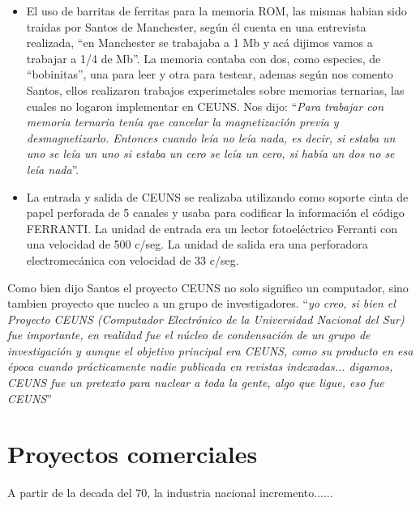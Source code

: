 \documentclass[%
 	final,
%
	notitlepage,
	narroweqnarray,
	inline,
 	twoside,
	]{ieee}
\begin{document}
\begin{itemize}
\item El uso de barritas de ferritas para la memoria ROM, las mismas habian sido traidas por Santos de Manchester, seg\'un \'el cuenta en una entrevista realizada, ``en Manchester se trabajaba a 1 Mb y ac\'a dijimos vamos a trabajar a 1/4 de Mb''. La memoria contaba con dos, como especies, de ``bobinitas'', una para leer y otra para testear, ademas seg\'un nos comento Santos, ellos realizaron trabajos experimetales sobre memorias ternarias, las cuales no logaron implementar en CEUNS. Nos dijo: ``\textit{Para trabajar con memoria ternaria ten\'ia que cancelar la magnetizaci\'on previa y desmagnetizarlo. Entonces cuando le\'ia no le\'ia nada, es decir, si estaba un uno se le\'ia un uno si estaba un cero se le\'ia un cero, si hab\'ia un dos no se le\'ia nada}''.
\item La entrada y salida de CEUNS se realizaba utilizando como soporte cinta de papel perforada de 5 canales y usaba para codificar la informaci\'on el c\'odigo FERRANTI. La unidad de entrada era un lector fotoel\'ectrico Ferranti con una velocidad de 500 c/seg. La unidad de salida era una perforadora electromec\'anica con velocidad de 33 c/seg.
\end{itemize}

Como bien dijo Santos el proyecto CEUNS no solo significo un computador, sino tambien proyecto que nucleo a un grupo de investigadores.
``\textit{yo creo, si bien el Proyecto CEUNS (Computador Electr\'onico de la Universidad Nacional del Sur) fue importante, en realidad fue el n\'ucleo de condensaci\'on de un grupo de investigaci\'on y aunque el objetivo principal era CEUNS, como su producto en esa \'epoca cuando pr\'acticamente nadie publicada en revistas indexadas... digamos, CEUNS fue un pretexto para nuclear a toda la gente, algo que ligue, eso fue CEUNS}''

\section{Proyectos comerciales}
A partir de la decada del 70, la industria nacional incremento......
\end{document}
